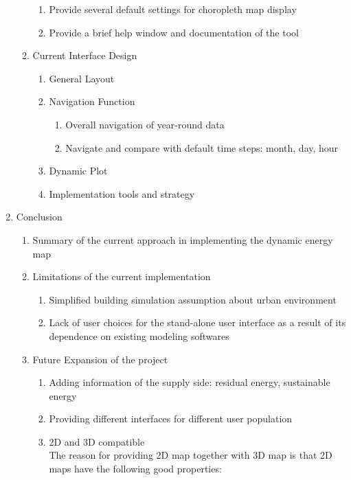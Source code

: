 \documentclass[12pt]{article}
\begin{document}
\begin{enumerate}
\begin{enumerate}[label*=\arabic*.]
\begin{enumerate}[label*=\arabic*.]
    \item Provide several default settings for choropleth map display
    \item Provide a brief help window and documentation of the tool
    \end{enumerate}
  \item Current Interface Design
    \begin{enumerate}[label*=\arabic*.]
    \item General Layout
    \item Navigation Function
      \begin{enumerate}[label*=\arabic*.]
      \item Overall navigation of year-round data
      \item Navigate and compare with default time steps: month, day,
        hour
      \end{enumerate}
    \item Dynamic Plot
    \item Implementation tools and strategy
    \end{enumerate}
  \end{enumerate}
\item Conclusion
  \begin{enumerate}[label*=\arabic*.]
  \item Summary of the current approach in implementing the dynamic
    energy map
  \item Limitations of the current implementation
    \begin{enumerate}[label*=\arabic*.]
    \item Simplified building simulation assumption about urban
      environment
    \item Lack of user choices for the stand-alone user interface as a
      result of its dependence on existing modeling softwares
    \end{enumerate}
  \item Future Expansion of the project
    \begin{enumerate}[label*=\arabic*.]
    \item Adding information of the supply side: residual energy,
      sustainable energy
    \item Providing different interfaces for different user population
    \item 2D and 3D compatible \\The reason for providing 2D map
      together with 3D map is that 2D maps have the following good
      properties:

\end{enumerate}
\end{enumerate}
\end{enumerate}
\end{document}
